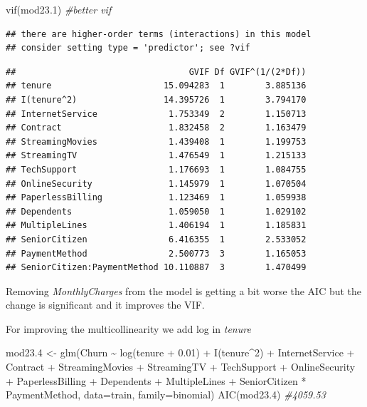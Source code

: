 \documentclass[
  twoside]{article}
\newenvironment{Shaded}{\begin{snugshade}}{\end{snugshade}}
\newcommand{\AttributeTok}[1]{\textcolor[rgb]{0.77,0.63,0.00}{#1}}
\newcommand{\CommentTok}[1]{\textcolor[rgb]{0.56,0.35,0.01}{\textit{#1}}}
\newcommand{\DecValTok}[1]{\textcolor[rgb]{0.00,0.00,0.81}{#1}}
\newcommand{\FloatTok}[1]{\textcolor[rgb]{0.00,0.00,0.81}{#1}}
\newcommand{\FunctionTok}[1]{\textcolor[rgb]{0.00,0.00,0.00}{#1}}
\newcommand{\NormalTok}[1]{#1}
\newcommand{\OtherTok}[1]{\textcolor[rgb]{0.56,0.35,0.01}{#1}}
\newcommand{\SpecialCharTok}[1]{\textcolor[rgb]{0.00,0.00,0.00}{#1}}
\begin{document}
\begin{Shaded}
\begin{Highlighting}[]
\FunctionTok{vif}\NormalTok{(mod23}\FloatTok{.1}\NormalTok{) }\CommentTok{\#better vif}
\end{Highlighting}
\end{Shaded}

\begin{verbatim}
## there are higher-order terms (interactions) in this model
## consider setting type = 'predictor'; see ?vif
\end{verbatim}

\begin{verbatim}
##                                  GVIF Df GVIF^(1/(2*Df))
## tenure                      15.094283  1        3.885136
## I(tenure^2)                 14.395726  1        3.794170
## InternetService              1.753349  2        1.150713
## Contract                     1.832458  2        1.163479
## StreamingMovies              1.439408  1        1.199753
## StreamingTV                  1.476549  1        1.215133
## TechSupport                  1.176693  1        1.084755
## OnlineSecurity               1.145979  1        1.070504
## PaperlessBilling             1.123469  1        1.059938
## Dependents                   1.059050  1        1.029102
## MultipleLines                1.406194  1        1.185831
## SeniorCitizen                6.416355  1        2.533052
## PaymentMethod                2.500773  3        1.165053
## SeniorCitizen:PaymentMethod 10.110887  3        1.470499
\end{verbatim}

Removing \emph{MonthlyCharges} from the model is getting a bit worse the
AIC but the change is significant and it improves the VIF.

For improving the multicollinearity we add log in \emph{tenure}

\begin{Shaded}
\begin{Highlighting}[]
\NormalTok{mod23}\FloatTok{.4} \OtherTok{\textless{}{-}} \FunctionTok{glm}\NormalTok{(Churn }\SpecialCharTok{\textasciitilde{}} \FunctionTok{log}\NormalTok{(tenure }\SpecialCharTok{+} \FloatTok{0.01}\NormalTok{) }\SpecialCharTok{+} \FunctionTok{I}\NormalTok{(tenure}\SpecialCharTok{\^{}}\DecValTok{2}\NormalTok{) }\SpecialCharTok{+}\NormalTok{ InternetService }\SpecialCharTok{+} 
\NormalTok{                 Contract }\SpecialCharTok{+}\NormalTok{ StreamingMovies }\SpecialCharTok{+}\NormalTok{ StreamingTV }\SpecialCharTok{+}\NormalTok{ TechSupport }\SpecialCharTok{+} 
\NormalTok{                 OnlineSecurity }\SpecialCharTok{+}\NormalTok{ PaperlessBilling }\SpecialCharTok{+}\NormalTok{ Dependents }\SpecialCharTok{+}\NormalTok{ MultipleLines}
               \SpecialCharTok{+}\NormalTok{ SeniorCitizen }\SpecialCharTok{*}\NormalTok{ PaymentMethod, }\AttributeTok{data=}\NormalTok{train, }\AttributeTok{family=}\NormalTok{binomial)}
\FunctionTok{AIC}\NormalTok{(mod23}\FloatTok{.4}\NormalTok{) }\CommentTok{\#4059.53}
\end{Highlighting}
\end{Shaded}
\end{document}
